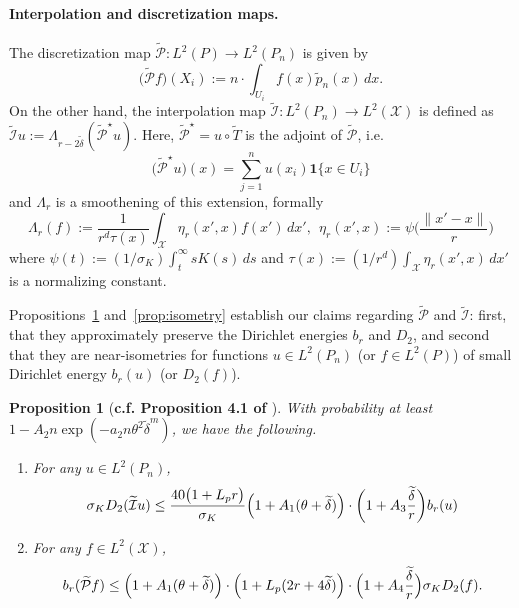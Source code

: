 \documentclass[twoside]{article}
\newcommand{\1}{\mathbf{1}}
\newcommand{\Xset}{\mathcal{X}}
\newcommand{\Leb}{L}
\newcommand{\mc}[1]{\mathcal{#1}}
\newcommand{\wt}[1]{\widetilde{#1}}
\newtheorem{proposition}{Proposition}
\theoremstyle{definition}
\theoremstyle{remark}
\begin{document}
\paragraph{Interpolation and discretization maps.}

The discretization map  $\wt{\mathcal{P}}: \Leb^2(P) \to \Leb^2(P_n)$ is given by
\begin{equation*}
\bigl(\wt{\mathcal{P}}f\bigr)(X_i) := n \cdot \int_{U_i} f(x) \wt{p}_n(x) \,dx.
\end{equation*}
On the other hand, the interpolation map $\wt{\mc{I}}: \Leb^2(P_n) \to \Leb^2(\Xset)$ is defined as $\wt{\mc{I}}u := \Lambda_{r - 2\wt{\delta}}(\wt{\mc{P}}^{\star}u)$. Here, $\wt{\mc{P}}^{\star} = u \circ \wt{T}$ is the adjoint of $\wt{\mc{P}}$, i.e.
\begin{equation*}
\bigl(\wt{\mc{P}}^{\star}u\bigr)(x) = \sum_{j = 1}^{n} u(x_i) \1\{x \in U_i\} 
\end{equation*} 
and $\Lambda_r$ is a smoothening of this extension, formally
\begin{equation*}
\Lambda_r(f) := \frac{1}{r^d\tau(x)}\int_{\Xset} \eta_r(x',x) f(x') \,dx',~~ \eta_r(x',x) := \psi\biggl(\frac{\|x' - x\|}{r}\biggr)
\end{equation*}
where $\psi(t) := (1/\sigma_K)\int_{t}^{\infty} s K(s) \,ds$ and $\tau(x) := (1/r^d)\int_{\Xset} \eta_r(x',x) \,dx'$ is a normalizing constant.

Propositions~\ref{prop:dirichlet_energies} and~\ref{prop:isometry} establish our claims regarding $\wt{\mc{P}}$ and $\wt{\mc{I}}$: first, that they approximately preserve the Dirichlet energies $b_r$ and $D_2$, and second that they are near-isometries for functions $u \in \Leb^2(P_n)$ (or $f \in \Leb^2(P)$) of small Dirichlet energy $b_r(u)$ (or $D_2(f)$).

\begin{proposition}[\textbf{c.f. Proposition 4.1 of \citet{calder2019}}]
	\label{prop:dirichlet_energies}
	With probability at least $1 - A_2n\exp(-a_2n\theta^2\wt{\delta}^{m})$, we have the following.
	\begin{enumerate}[(1)]
		\item For any $u \in \Leb^2(P_n)$,
		\begin{equation*}
		\sigma_{K} D_2(\wt{\mc{I}}u) \leq \frac{40 \bigl(1 + L_p r\bigr)}{\sigma_K} \Bigl(1 + A_1(\theta + \wt{\delta})\Bigr) \cdot \biggl(1 + A_3\frac{\wt{\delta}}{r}\biggr) b_r(u)
		\end{equation*}
		\item For any $f \in \Leb^2(\Xset)$,
		\begin{equation*}
		b_r(\wt{\mc{P}}f) \leq \Bigl(1 + A_1(\theta + \wt{\delta})\Bigr) \cdot \Bigl(1 + L_p(2r + 4\wt{\delta})\Bigr) \cdot \Bigl(1 + A_4\frac{\wt{\delta}}{r}\Bigr) \sigma_{K} D_2(f).
		\end{equation*}
	\end{enumerate}
\end{proposition}
\end{document}
